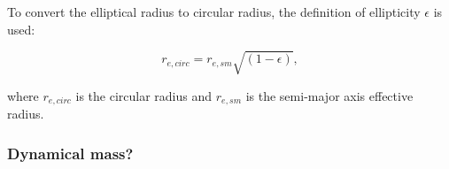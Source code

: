To convert the elliptical radius to circular radius, the definition of ellipticity $\epsilon$ is used:

\begin{equation}
   r_{e, circ} = r_{e,sm}\sqrt{(1-\epsilon)},
\end{equation}

where $r_{e, circ}$ is the circular radius and $r_{e,sm}$ is the semi-major axis effective radius.

\subsubsection{Dynamical mass?}